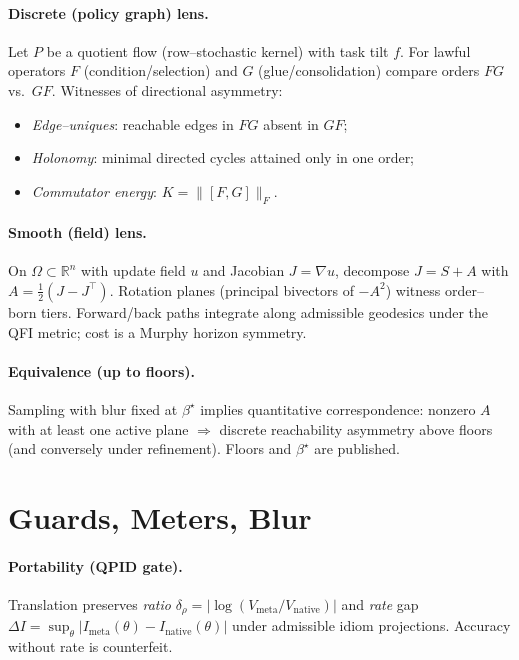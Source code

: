 \documentclass[11pt]{article}
\begin{document}
\paragraph{Discrete (policy graph) lens.}
Let $P$ be a quotient flow (row--stochastic kernel) with task tilt $f$. For lawful operators $F$ (condition/selection) and $G$ (glue/consolidation) compare orders $FG$ vs.\ $GF$. Witnesses of directional asymmetry:
\begin{itemize}[leftmargin=1.25em]
\item \emph{Edge--uniques}: reachable edges in $FG$ absent in $GF$;
\item \emph{Holonomy}: minimal directed cycles attained only in one order;
\item \emph{Commutator energy}: $K=\|[F,G]\|_F$.
\end{itemize}

\paragraph{Smooth (field) lens.}
On $\Omega\subset\mathbb{R}^n$ with update field $u$ and Jacobian $J=\nabla u$, decompose $J=S+A$ with $A=\frac12(J-J^\top)$. Rotation planes (principal bivectors of $-A^2$) witness order--born tiers. Forward/back paths integrate along admissible geodesics under the QFI metric; cost is a Murphy horizon symmetry.

\paragraph{Equivalence (up to floors).}
Sampling with blur fixed at $\beta^\star$ implies quantitative correspondence: nonzero $A$ with at least one active plane $\Rightarrow$ discrete reachability asymmetry above floors (and conversely under refinement). Floors and $\beta^\star$ are published.

\section{Guards, Meters, Blur}\label{sec:meters}
\paragraph{Portability (QPID gate).}
Translation preserves \emph{ratio} $\delta_\rho=\big|\log(V_{\text{meta}}/V_{\text{native}})\big|$ and \emph{rate} gap $\Delta I=\sup_\theta\big|I_{\text{meta}}(\theta)-I_{\text{native}}(\theta)\big|$ under admissible idiom projections. Accuracy without rate is counterfeit.
\end{document}
